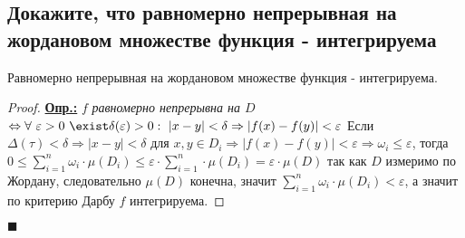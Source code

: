 
\subsection{Докажите, что равномерно непрерывная на жордановом множестве функция - интегрируема}

\begin{theorem*}
    Равномерно непрерывная на жордановом множестве функция - интегрируема.
\end{theorem*}

\begin{proof}
    \textbf{\underline{Опр.:} } $f$ \textit{равномерно непрерывна на $D$} $\Leftrightarrow\forall\ \varepsilon>0\ \exist\delta(\varepsilon) >0:\ |x-y|<\delta\Rightarrow |f(x)-f(y)|<\varepsilon$
    Если $\Delta(\tau) < \delta \Rightarrow |x-y|<\delta$ для $x,y\in D_i\Rightarrow |f(x)-f(y)|<\varepsilon\Rightarrow \omega_i\leq \varepsilon$, тогда
    $0\leq \sum\limits_{i=1}^n \omega_i\cdot\mu(D_i)\leq \varepsilon\cdot\sum\limits_{i=1}^n \cdot\mu(D_i)=\varepsilon\cdot\mu(D)$
    так как $D$ измеримо по Жордану, следовательно $\mu(D)$ конечна, значит $\sum\limits_{i=1}^n \omega_i\cdot\mu(D_i)<\varepsilon$, а значит по критерию Дарбу $f$ интегрируема.
\end{proof}
\begin{flushright}
$\blacksquare$
\end{flushright}
